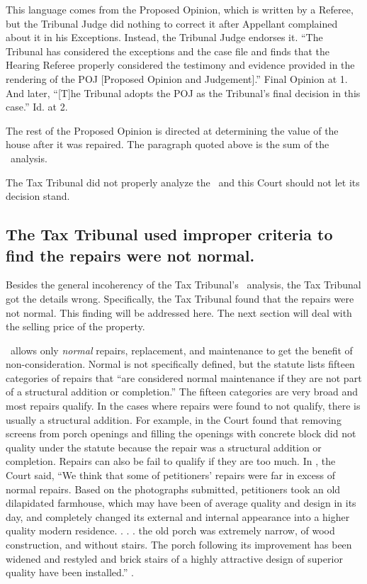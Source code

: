 \documentclass[12pt,\documentclassflag]{michiganCourtOfAppealsBrief}
\def\mathieuGast{\pincite[l]{MCL}{211.27(2)}}
\begin{document}
This language comes from the Proposed Opinion, which is written by a Referee, but the Tribunal Judge did nothing to correct it after Appellant complained about it in his Exceptions. Instead, the Tribunal Judge endorses it. ``The Tribunal has considered the exceptions and the case file and finds that the Hearing Referee properly considered the testimony and evidence provided in the rendering of the POJ [Proposed Opinion and Judgement].'' Final Opinion at 1. And later, ``[T]he Tribunal adopts the POJ as the Tribunal's final decision in this case.'' Id. at 2.

The rest of the Proposed Opinion is directed at determining the value of the house after it was repaired. The paragraph quoted above is the sum of the \mathieuGast\ analysis.

The Tax Tribunal did not properly analyze the \mathieuGast\ and this Court should not let its decision stand. 

\subsection{The Tax Tribunal used improper criteria to find the repairs were not normal.}

Besides the general incoherency of the Tax Tribunal's \mathieuGast\ analysis, the Tax Tribunal got the details wrong. Specifically, the Tax Tribunal found that the repairs were not normal. This finding will be addressed here. The next section will deal with the selling price of the property.

\mathieuGast\ allows only \emph{normal} repairs, replacement, and maintenance to get the benefit of non-consideration. Normal is not specifically defined, but the statute lists fifteen categories of repairs that ``are considered normal maintenance if they are not part of a structural addition or completion.'' The fifteen categories are very broad and most repairs qualify. In the cases where repairs were found to not qualify, there is usually a structural addition. For example, in \cite{Coyne} the Court found that removing screens from porch openings and filling the openings with concrete block did not quality under the statute because the repair was a structural addition or completion. Repairs can also be fail to qualify if they are too much. In \cite{Fisher}, the Court said, ``We think that some of petitioners' repairs were far in excess of normal repairs. Based on the photographs submitted, petitioners took an old dilapidated farmhouse, which may have been of average quality and design in its day, and completely changed its external and internal appearance into a higher quality modern residence. . . . the old porch was extremely narrow, of wood construction, and without stairs. The porch following its improvement has been widened and restyled and brick stairs of a highly attractive design of superior quality have been installed.'' .
\end{document}
